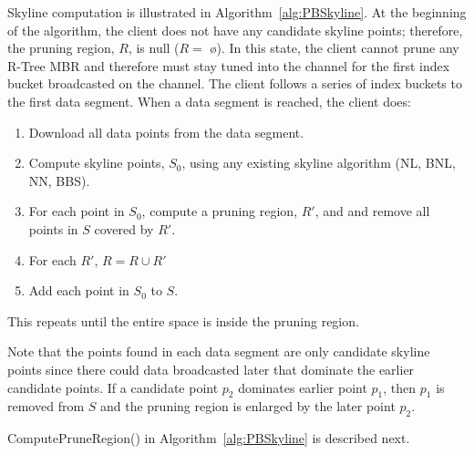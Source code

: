 Skyline computation is illustrated in
Algorithm~\ref{alg:PBSkyline}. At the beginning of the algorithm,
the client does not have any candidate skyline points; therefore,
the pruning region, $R$, is null ($R =$ {\o}).
In this state, the client cannot prune any R-Tree MBR and
therefore must stay tuned into the channel for the first index bucket
broadcasted on the channel. The client follows a series of index
buckets to the first data segment.
When a data segment is reached, the client does:
\begin{enumerate}
\item Download all data points from the data segment.
\item Compute skyline points, $S_0$, using any existing skyline algorithm
        (NL, BNL, NN, BBS).
\item For each point in $S_0$, compute a pruning region, $R'$, and and remove
    all points in $S$ covered by $R'$.
\item For each $R'$, $R = R \cup R'$
\item Add each point in $S_0$ to $S$.
\end{enumerate}
This repeats until the entire space is inside the pruning region.

Note that the points found in each data segment are only candidate skyline
points since there could data broadcasted later
that dominate the earlier candidate points. If a candidate point
$p_2$ dominates earlier point $p_1$, then $p_1$ is removed from
$S$ and the pruning region is enlarged by the later point $p_2$.

ComputePruneRegion() in Algorithm~\ref{alg:PBSkyline} is described
next.

